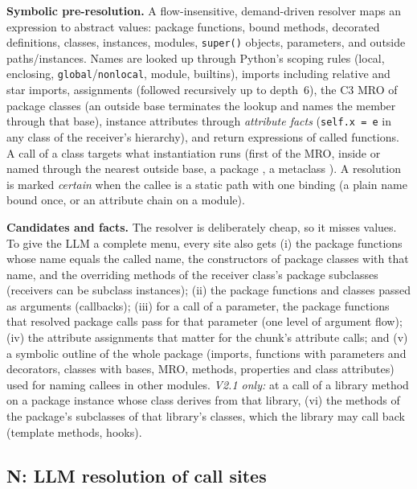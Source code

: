 \textbf{Symbolic pre-resolution.} A flow-insensitive, demand-driven resolver
maps an expression to abstract values: package functions, bound methods,
decorated definitions, classes, instances, modules, \texttt{super()} objects,
parameters, and outside paths/instances. Names are looked up through Python's
scoping rules (local, enclosing, \texttt{global}/\texttt{nonlocal}, module,
builtins), imports including relative and star imports, assignments (followed
recursively up to depth~6), the C3 MRO of package classes (an outside base
terminates the lookup and names the member through that base), instance
attributes through \emph{attribute facts} (\texttt{self.x = e} in any class of
the receiver's hierarchy), and return expressions of called functions. A call of
a class targets what instantiation runs (first  of the MRO,
inside or named through the nearest outside base, a package
, a metaclass ). A resolution is
marked \emph{certain} when the callee is a static path with one binding (a
plain name bound once, or an attribute chain on a module).

\textbf{Candidates and facts.} The resolver is deliberately cheap, so it misses
values. To give the LLM a complete menu, every site also gets (i) the package
functions whose name equals the called name, the constructors of package
classes with that name, and the overriding methods of the receiver class's
package subclasses (receivers can be subclass instances); (ii) the package
functions and classes passed as arguments (callbacks); (iii) for a call of a
parameter, the package functions that resolved package calls pass for that
parameter (one level of argument flow); (iv) the attribute assignments that
matter for the chunk's attribute calls; and (v) a symbolic outline of the
whole package (imports, functions with parameters and decorators, classes with
bases, MRO, methods, properties and class attributes) used for naming callees
in other modules. \emph{V2.1 only:} at a call of a library method on a package
instance whose class derives from that library, (vi) the methods of the
package's subclasses of that library's classes, which the library may call back
(template methods, hooks).

\subsection{N: LLM resolution of call sites}

